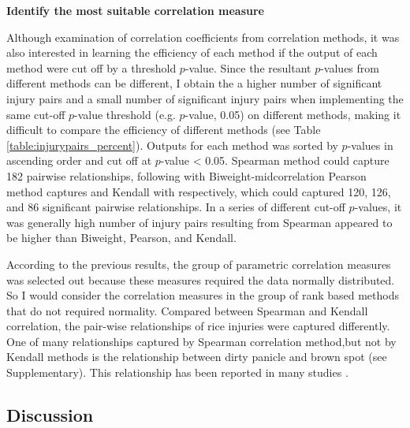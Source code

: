 \textbf{Identify the most suitable correlation measure}

Although examination of correlation coefficients from correlation methods, it was also interested in learning the efficiency of each method if the output of each method were cut off by a threshold $p$-value. Since the resultant $p$-values from different methods can be different, I obtain the a higher number of significant injury pairs and a small number of significant injury pairs when implementing the same cut-off $p$-value threshold (e.g. $p$-value, 0.05) on different methods, making it difficult to compare the efficiency of different methods (see Table \ref{table:injurypairs_percent}). Outputs for each method was sorted by $p$-values in ascending order and cut off at $p$-value < 0.05.  Spearman method could capture 182 pairwise relationships, following with Biweight-midcorrelation Pearson method captures and Kendall with respectively, which could captured 120, 126, and 86 significant pairwise relationships. In a series of different cut-off $p$-values, it was generally high number of injury pairs resulting from Spearman appeared to be higher than Biweight, Pearson, and Kendall.



According to the previous results, the group of parametric correlation measures was selected out because these measures required the data normally distributed. So I would consider the correlation measures in the group of rank based methods that do not required normality. Compared between Spearman and Kendall correlation, the pair-wise relationships of rice injuries were captured differently. One of many relationships captured by Spearman correlation method,but not by Kendall methods is the relationship between dirty panicle and brown spot (see Supplementary). This relationship has been reported in many studies \citep{Ou_1985_Rice, Barnwal_2013_Review}.

\newpage
\subsection{Discussion}

